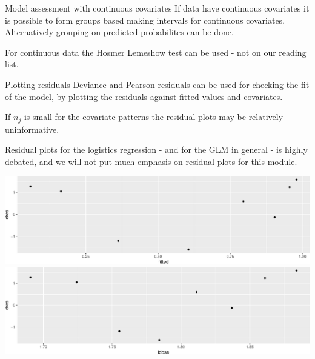 \documentclass[
  ignorenonframetext,
]{beamer}
\begin{document}
\begin{frame}
\begin{block}{Model assessment with continuous covariates}
\label{model-assessment-with-continuous-covariates}
If data have continuous covariates it is possible to form groups based
making intervals for continuous covariates. Alternatively grouping on
predicted probabilites can be done.

For continuous data the Hosmer Lemeshow test can be used - not on our
reading list.
\end{block}
\end{frame}

\begin{frame}
\begin{block}{Plotting residuals}
\label{plotting-residuals}
Deviance and Pearson residuals can be used for checking the fit of the
model, by plotting the residuals against fitted values and covariates.

If \(n_j\) is small for the covariate patterns the residual plots may be
relatively uninformative.

Residual plots for the logistics regression - and for the GLM in general
- is highly debated, and we will not put much emphasis on residual plots
for this module.
\end{block}
\end{frame}

\begin{frame}
\includegraphics{Module03BinRegPresentationWeek2_files/figure-beamer/unnamed-chunk-10-1.pdf}
\includegraphics{Module03BinRegPresentationWeek2_files/figure-beamer/unnamed-chunk-10-2.pdf}
\end{frame}
\end{document}

